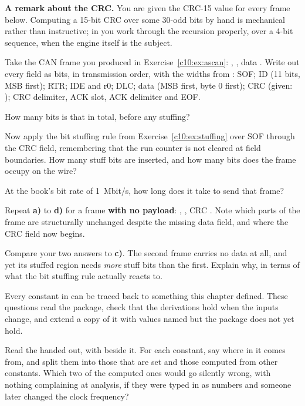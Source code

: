 \begin{aside}
\textbf{A remark about the CRC.} You are given the CRC-15 value for every frame below. Computing a
15-bit CRC over some 30-odd bits by hand is mechanical rather than instructive; in 
you work through the recursion properly, over a 4-bit sequence, when the engine itself is the
subject.
\end{aside}

 Take the CAN frame you produced in Exercise~\ref{c10:ex:ascan}: ,
, data . Write out every field as bits, in transmission order, with the
widths from : SOF; ID (11 bits, MSB first); RTR; IDE and r0; DLC; data
(MSB first, byte 0 first); CRC (given: ); CRC delimiter, ACK slot, ACK delimiter
and EOF.

 How many bits is that in total, before any stuffing?

 Now apply the bit stuffing rule from Exercise~\ref{c10:ex:stuffing} over SOF through the
CRC field, remembering that the run counter is not cleared at field boundaries. How many stuff bits
are inserted, and how many bits does the frame occupy on the wire?

 At the book's bit rate of 1~Mbit/s, how long does it take to send that frame?

 Repeat \textbf{a)} to \textbf{d)} for a frame \textbf{with no payload}: ,
, CRC . Note which parts of the frame are structurally unchanged
despite the missing data field, and where the CRC field now begins.

 Compare your two answers to \textbf{c)}. The second frame carries no data at all, and yet
its stuffed region needs \emph{more} stuff bits than the first. Explain why, in terms of what the bit
stuffing rule actually reacts to.


\label{c10:ex:package}
Every constant in  can be traced back to something this chapter defined. These
questions read the package, check that the derivations hold when the inputs change, and extend a copy
of it with values  named but the package does not yet hold.

 Read the  handed out, with  beside it.
For each constant, say where in  it comes from, and split them into those
that are set and those computed from other constants. Which two of the computed ones would go
silently wrong, with nothing complaining at analysis, if they were typed in as numbers and someone
later changed the clock frequency?

